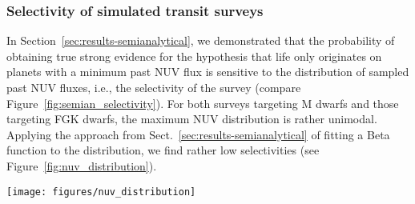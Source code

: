 \documentclass[twocolumn,twocolappendix,linenumbers]{aastex631}
\begin{document}
\subsubsection{Selectivity of simulated transit surveys}
In Section~\ref{sec:results-semianalytical}, we demonstrated that the probability of obtaining true strong evidence for the hypothesis that life only originates on planets with a minimum past \gls{NUV} flux is sensitive to the distribution of sampled past \gls{NUV} fluxes, i.e., the selectivity of the survey (compare Figure~\ref{fig:semian_selectivity}).
For both surveys targeting M dwarfs and those targeting FGK dwarfs, the maximum \gls{NUV} distribution is rather unimodal.
Applying the approach from Sect.~\ref{sec:results-semianalytical} of fitting a Beta function to the distribution, we find rather low selectivities (see Figure~\ref{fig:nuv_distribution}).
\begin{figure*}
    \begin{centering}
        \texttt{[image: figures/nuv\_distribution]}
        \caption{Distribution of maximum past \gls{NUV} flux in transit surveys targeting \glspl{EEC} around FGK and M~stars, respectively. The best-fit beta distributions (gray) correspond to selectivities of $s_\mathrm{FGK} = $ and $s_\mathrm{M} = $. Red areas show inhabited planets for a threshold \gls{NUV} flux of $F_\mathrm{NUV, min} = \var{NUV_thresh}\,\SI{}{\erg\per\second\per\centi\meter\squared}$ and an abiogenesis rate of $f_\mathrm{life} = \var{f_life}$.}
        \label{fig:nuv_distribution}
    \end{centering}
\end{figure*}
\end{document}
